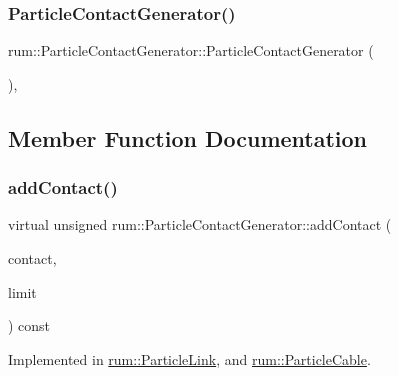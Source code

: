 \mbox{\label{classrum_1_1_particle_contact_generator_aefec37ffef72a54397c6952c6d2e65ba}} 
\subsubsection{\texorpdfstring{Particle\+Contact\+Generator()}{ParticleContactGenerator()}}
{\footnotesize\ttfamily rum\+::\+Particle\+Contact\+Generator\+::\+Particle\+Contact\+Generator (\begin{DoxyParamCaption}{ }\end{DoxyParamCaption})\hspace{0.3cm}{\ttfamily [explicit]}, {\ttfamily [protected]}}



\subsection{Member Function Documentation}
\mbox{\label{classrum_1_1_particle_contact_generator_a343d3df815d7e170458fe937fe82aad5}} 
\subsubsection{\texorpdfstring{add\+Contact()}{addContact()}}
{\footnotesize\ttfamily virtual unsigned rum\+::\+Particle\+Contact\+Generator\+::add\+Contact (\begin{DoxyParamCaption}\item[{\mbox{\hyperlink{classrum_1_1_particle_contact}{Particle\+Contact}} $\ast$}]{contact,  }\item[{unsigned int}]{limit }\end{DoxyParamCaption}) const\hspace{0.3cm}{\ttfamily [pure virtual]}}



Implemented in \mbox{\hyperlink{classrum_1_1_particle_link_a0da76619bd1d2ae04d5f8173c2883ff2}{rum\+::\+Particle\+Link}}, and \mbox{\hyperlink{classrum_1_1_particle_cable_a078344be0db7ccc00d326ac767736431}{rum\+::\+Particle\+Cable}}.



